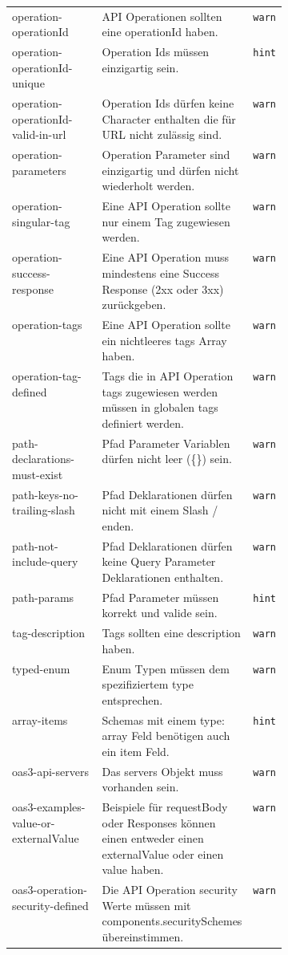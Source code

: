 {\begin{longtable}{lp{0.4\linewidth}r}
    operation-operationId & API Operationen sollten eine operationId haben. & \texttt{warn}\\
    operation-operationId-unique & Operation Ids müssen einzigartig sein. & \texttt{hint}\\
    operation-operationId-valid-in-url & Operation Ids dürfen keine Character enthalten die für \acf{URL} nicht zulässig sind. & \texttt{warn}\\
    operation-parameters & Operation Parameter sind einzigartig und dürfen nicht wiederholt werden. & \texttt{warn}\\
    operation-singular-tag & Eine API Operation sollte nur einem Tag zugewiesen werden. & \texttt{warn} \\
    operation-success-response & Eine API Operation muss mindestens eine Success Response (2xx oder 3xx) zurückgeben. & \texttt{warn}\\
    operation-tags & Eine API Operation sollte ein nichtleeres tags Array haben. & \texttt{warn}\\
    operation-tag-defined & Tags die in API Operation tags zugewiesen werden müssen in globalen tags definiert werden. & \texttt{warn}\\
    path-declarations-must-exist & Pfad Parameter Variablen dürfen nicht leer (\{\}) sein. & \texttt{warn}\\
    path-keys-no-trailing-slash & Pfad Deklarationen dürfen nicht mit einem Slash / enden. & \texttt{warn}\\
    path-not-include-query & Pfad Deklarationen dürfen keine Query Parameter Deklarationen enthalten. & \texttt{warn}\\
    path-params & Pfad Parameter müssen korrekt und valide sein. & \texttt{hint}\\
    tag-description & Tags sollten eine description haben. & \texttt{warn} \\
    typed-enum & Enum Typen müssen dem spezifiziertem type entsprechen. & \texttt{warn}\\
    array-items & Schemas mit einem type: array Feld benötigen auch ein item Feld. & \texttt{hint}\\
    oas3-api-servers & Das servers Objekt muss vorhanden sein. & \texttt{warn}\\
    oas3-examples-value-or-externalValue & Beispiele für requestBody oder Responses können einen entweder einen externalValue oder einen value haben. & \texttt{warn}\\
    oas3-operation-security-defined & Die API Operation security Werte müssen mit components.securitySchemes übereinstimmen. & \texttt{warn}\\

\end{longtable}}
